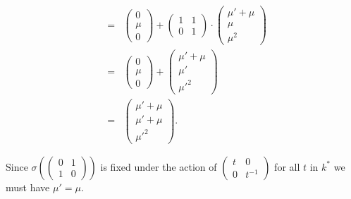\begin{eqnarray*}
&=&
\left(\begin{matrix} 0 \\ \mu \\ 0 \end{matrix}\right)
+
\left(\begin{matrix} 1 & 1 \\ 0 & 1 \end{matrix}\right) \cdot
\left(\begin{matrix} \mu' + \mu \\ \mu \\ \mu^2 \end{matrix}\right)\\
&=&
\left(\begin{matrix} 0 \\ \mu \\ 0 \end{matrix}\right)
+
\left(\begin{matrix} \mu' + \mu \\ \mu' \\ \mu'^2 \end{matrix}\right)\\
&=&
\left(\begin{matrix} \mu' + \mu \\ \mu' + \mu \\ \mu'^2 \end{matrix}\right).
\end{eqnarray*}

Since $\sigma\left(\left(\begin{matrix} 0 & 1 \\ 1 & 0\end{matrix}\right)\right)$ is fixed under the action of $\left(\begin{matrix} t & 0 \\ 0 & t^{-1}\end{matrix}\right)$ for all $t$ in $k^*$ we must have $\mu'=\mu$. 


